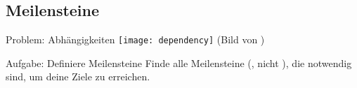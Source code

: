 %
%
%


\subsection{Meilensteine}


\begin{frame}[c]{Problem: Abhängigkeiten}
    \normalsize
    \texttt{[image: dependency]}
    (Bild von \cite{dependency-pic})
\end{frame}



\begin{frame}[c]
    \begin{block}{Aufgabe: Definiere Meilensteine}
        Finde alle Meilensteine (, nicht ), die
        notwendig sind, um deine Ziele zu erreichen.
    \end{block}
\end{frame}


%
%
%


